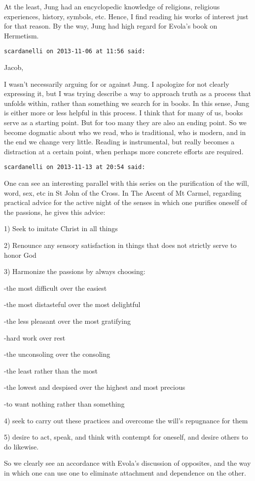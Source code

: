 \begin{footnotesize}
\begin{sffamily}
At the least, Jung had an encyclopedic knowledge of religions, religious experiences, history, symbols, etc. Hence, I find reading his works of interest just for that reason. By the way, Jung had high regard for Evola's book on Hermetism.


\hfill

\texttt{scardanelli on 2013-11-06 at 11:56 said: }

Jacob,

I wasn't necessarily arguing for or against Jung. I apologize for not clearly expressing it, but I was trying describe a way to approach truth as a process that unfolds within, rather than something we search for in books. In this sense, Jung is either more or less helpful in this process. I think that for many of us, books serve as a starting point. But for too many they are also an ending point. So we become dogmatic about who we read, who is traditional, who is modern, and in the end we change very little. Reading is instrumental, but really becomes a distraction at a certain point, when perhaps more concrete efforts are required.


\hfill

\texttt{scardanelli on 2013-11-13 at 20:54 said: }

One can see an interesting parallel with this series on the purification of the will, word, sex, etc in St John of the Cross. In The Ascent of Mt Carmel, regarding practical advice for the active night of the senses in which one purifies oneself of the passions, he gives this advice:

1) Seek to imitate Christ in all things

2) Renounce any sensory satisfaction in things that does not strictly serve to honor God

3) Harmonize the passions by always choosing:

{}-the most difficult over the easiest

{}-the most distasteful over the most delightful

{}-the less pleasant over the most gratifying

{}-hard work over rest

{}-the unconsoling over the consoling

{}-the least rather than the most

{}-the lowest and despised over the highest and most precious

{}-to want nothing rather than something

4) seek to carry out these practices and overcome the will's repugnance for them

5) desire to act, speak, and think with contempt for oneself, and desire others to do likewise.

So we clearly see an accordance with Evola's discussion of opposites, and the way in which one can use one to eliminate attachment and dependence on the other.


\hfill


\end{sffamily}\end{footnotesize}
